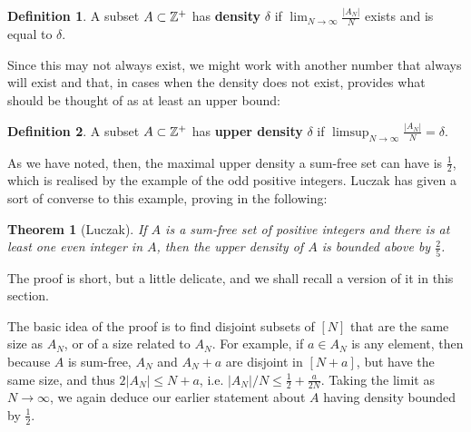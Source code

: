 \documentclass{article}
\newtheorem{theorem}{Theorem}[section]
\theoremstyle{definition}
\newtheorem{definition}{Definition}
\theoremstyle{remark}
\numberwithin{equation}{section}
\begin{document}
\begin{definition}
  A subset $A \subset \mathbb{Z}^+$ has \textbf{density} $\delta$ if
  $\lim_{N \to \infty} \frac{|A_N|}{N}$ exists and is equal to
  $\delta$.
\end{definition}

Since this may not always exist, we might work with another number
that always will exist and that, in cases when the density does not
exist, provides what should be thought of as at least an upper bound: 

\begin{definition}
  A subset $A \subset \mathbb{Z}^+$ has \textbf{upper density} $\delta$ if
  $\limsup_{N \to \infty}\frac{|A_N|}{N} = \delta$.
\end{definition}

As we have noted, then, the maximal upper density a sum-free set can
have is $\frac12$, which is realised by the example of the odd
positive integers.  Luczak has given a sort of converse to this
example, proving in \cite{sumfree_regularity_luczak} the following: 

\begin{theorem}[Luczak]
If $A$ is a sum-free set of positive integers and there is at least
one even integer in $A$, then the upper density of $A$ is bounded
above by $\frac25$.  
\end{theorem}  

The proof is short, but a
little delicate, and we shall recall a version of it in this section.

The basic idea of the proof is to find disjoint subsets of $[N]$ that
are the same size as $A_N$, or of a size related to $A_N$.  For
example, if $a \in A_N$ is any element, then because $A$ is sum-free,
$A_N$ and $A_N+a$ are disjoint in $[N+a]$, but have the same size, and
thus $2|A_N| \leq N+a$, i.e. $|A_N|/N \leq \frac12 + \frac{a}{2N}$.
Taking the limit as $N \to \infty$, we again deduce our earlier
statement about $A$ having density bounded by $\frac12$.
\end{document}
